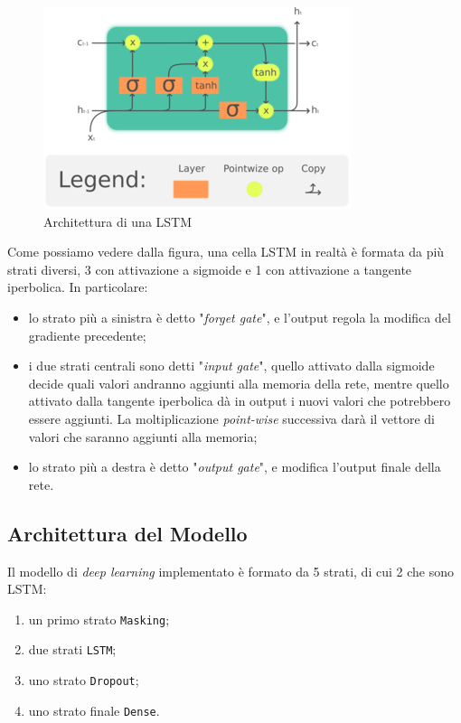 \documentclass[8pt,notitlepage]{report}
\begin{document}
		\begin{figure}[H]
			\begin{center}
				\includegraphics[scale=2.2]{lstm}
				\caption{Architettura di una LSTM}
			\end{center}
		\end{figure}		
		
		Come possiamo vedere dalla figura, una cella LSTM in realtà è formata da più strati diversi, 3 con attivazione a sigmoide e 1 con attivazione a tangente iperbolica.
		In particolare:
		\begin{itemize}
			\item lo strato più a sinistra è detto "\textit{forget gate}", e l'output regola la modifica del gradiente precedente;
			\item i due strati centrali sono detti "\textit{input gate}", quello attivato dalla sigmoide decide quali valori andranno aggiunti alla memoria della rete, mentre quello attivato dalla tangente iperbolica dà in output i nuovi valori che potrebbero essere aggiunti. La moltiplicazione \textit{point-wise} successiva darà il vettore di valori che saranno aggiunti alla memoria; 
			\item lo strato più a destra è detto "\textit{output gate}", e modifica l'output finale della rete.
		\end{itemize}
		
		\subsection{Architettura del Modello}
			Il modello di \textit{deep learning} implementato è formato da 5 strati, di cui 2 che sono LSTM:
			\begin{enumerate}
				\item un primo strato \verb|Masking|;
				\item due strati \verb|LSTM|;
				\item uno strato \verb|Dropout|;
				\item uno strato finale \verb|Dense|.
			\end{enumerate}
			
\end{document}

